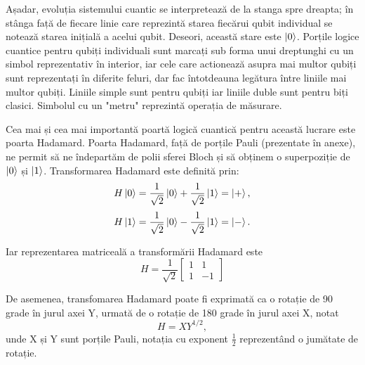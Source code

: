 Așadar, evoluția sistemului cuantic se interpretează de la stanga spre dreapta; în stânga față de fiecare linie care reprezintă starea fiecărui qubit individual se notează starea inițială a acelui qubit. Deseori, această stare este $\ket{0}$. Porțile logice cuantice pentru qubiți individuali sunt marcați sub forma unui dreptunghi cu un simbol reprezentativ în interior, iar cele care actionează asupra mai multor qubiți sunt reprezentați în diferite feluri, dar fac întotdeauna legătura între liniile mai multor qubiți. Liniile simple sunt pentru qubiți iar liniile duble sunt pentru biți clasici. Simbolul cu un "metru" reprezintă operația de măsurare.

Cea mai și cea mai importantă poartă logică cuantică pentru această lucrare este poarta Hadamard. Poarta Hadamard, față de porțile Pauli (prezentate în anexe), ne permit să ne îndepartăm de polii sferei Bloch și să obținem o superpoziție de $\ket{0}$ și $\ket{1}$. Transformarea Hadamard este definită prin:
\[
H\ket{0} = \frac{1}{\sqrt{2}} \ket{0} + \frac{1}{\sqrt{2}}\ket{1} = \ket{+},
\]
\[
H\ket{1} = \frac{1}{\sqrt{2}} \ket{0} - \frac{1}{\sqrt{2}}\ket{1} = \ket{-}.
\]

Iar reprezentarea matriceală a transformării Hadamard este 
\[
H = \frac{1}{\sqrt{2}}\begin{bmatrix}
1 & 1 \\
1 & -1
\end{bmatrix}
\]

De asemenea, transfomarea Hadamard poate fi exprimată ca o rotație de 90 grade în jurul axei Y, urmată de o rotație de 180 grade în jurul axei X, notat
\[
H = XY^{1/2},
\]
unde X și Y sunt porțile Pauli, notația cu exponent $\frac{1}{2}$ reprezentând o jumătate de rotație.

